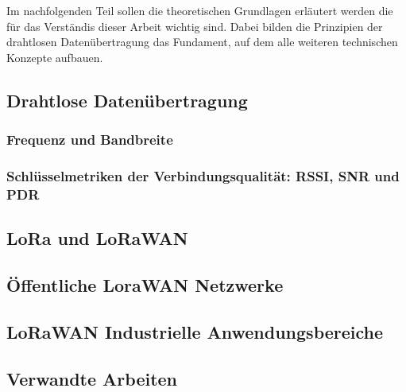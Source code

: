 Im nachfolgenden Teil sollen die theoretischen Grundlagen erläutert werden die für das Verständis dieser Arbeit wichtig sind. Dabei bilden die Prinzipien der drahtlosen Datenübertragung das Fundament, auf dem alle weiteren technischen Konzepte aufbauen.
\label{kap:grundlagen}
\subsection{Drahtlose Datenübertragung}

\subsubsection*{Frequenz und Bandbreite}

\subsubsection*{Schlüsselmetriken der Verbindungsqualität: RSSI, SNR und PDR}

\subsection{LoRa und LoRaWAN}

\subsection{Öffentliche LoraWAN Netzwerke}

\subsection{LoRaWAN Industrielle Anwendungsbereiche}

\subsection{Verwandte Arbeiten}
